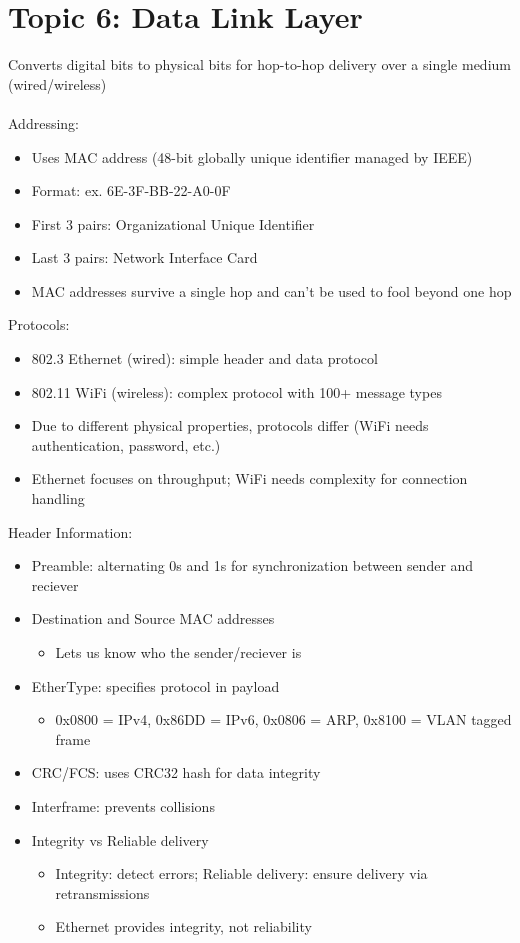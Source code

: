 \documentclass{article}
\begin{document}
\section*{Topic 6: Data Link Layer}
Converts digital bits to physical bits for hop-to-hop delivery over a single medium (wired/wireless) \\ \\
Addressing:
\begin{itemize}
    \item Uses MAC address (48-bit globally unique identifier managed by IEEE)
    \item Format: ex. 6E-3F-BB-22-A0-0F
    \item First 3 pairs: Organizational Unique Identifier
    \item Last 3 pairs: Network Interface Card
    \item MAC addresses survive a single hop and can't be used to fool beyond one hop
\end{itemize}

Protocols:
\begin{itemize}
    \item 802.3 Ethernet (wired): simple header and data protocol
    \item 802.11 WiFi (wireless): complex protocol with 100+ message types
    \item Due to different physical properties, protocols differ (WiFi needs authentication, password, etc.)
    \item Ethernet focuses on throughput; WiFi needs complexity for connection handling
\end{itemize}

Header Information:
\begin{itemize}
    \item Preamble: alternating 0s and 1s for synchronization between sender and reciever 
    \item Destination and Source MAC addresses
    \begin{itemize}
        \item Lets us know who the sender/reciever is
    \end{itemize}
    \item EtherType: specifies protocol in payload
    \begin{itemize}
        \item 0x0800 = IPv4, 0x86DD = IPv6, 0x0806 = ARP, 0x8100 = VLAN tagged frame
    \end{itemize}
    \item CRC/FCS: uses CRC32 hash for data integrity
    \item Interframe: prevents collisions
    \item Integrity vs Reliable delivery
    \begin{itemize}
        \item Integrity: detect errors; Reliable delivery: ensure delivery via retransmissions
        \item Ethernet provides integrity, not reliability
    \end{itemize}
\end{itemize}
\end{document}
